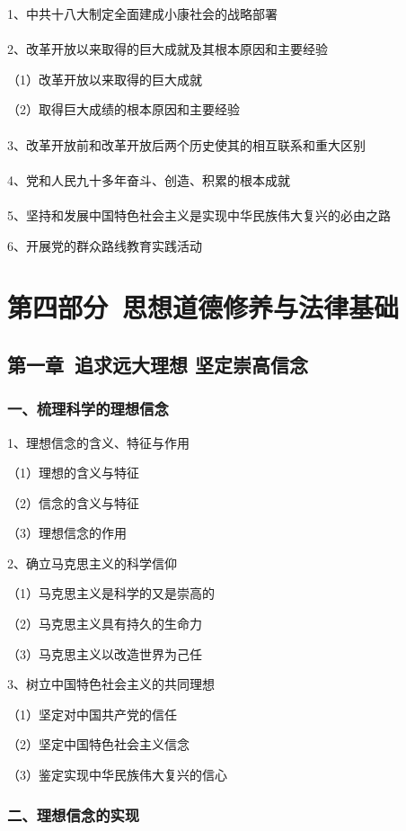 \documentclass{ctexart}
\begin{document}
1、中共十八大制定全面建成小康社会的战略部署
\\\\

2、改革开放以来取得的巨大成就及其根本原因和主要经验

（1）改革开放以来取得的巨大成就

（2）取得巨大成绩的根本原因和主要经验
\\\\

3、改革开放前和改革开放后两个历史使其的相互联系和重大区别
\\\\

4、党和人民九十多年奋斗、创造、积累的根本成就
\\\\

5、坚持和发展中国特色社会主义是实现中华民族伟大复兴的必由之路

6、开展党的群众路线教育实践活动

\section{第四部分\ 思想道德修养与法律基础}


\subsection{第一章\ 追求远大理想 坚定崇高信念}
\subsubsection{一、梳理科学的理想信念}
1、理想信念的含义、特征与作用

（1）理想的含义与特征

（2）信念的含义与特征

（3）理想信念的作用

2、确立马克思主义的科学信仰

（1）马克思主义是科学的又是崇高的

（2）马克思主义具有持久的生命力

（3）马克思主义以改造世界为己任

3、树立中国特色社会主义的共同理想

（1）坚定对中国共产党的信任

（2）坚定中国特色社会主义信念

（3）鉴定实现中华民族伟大复兴的信心

\subsubsection{二、理想信念的实现}
\end{document}
